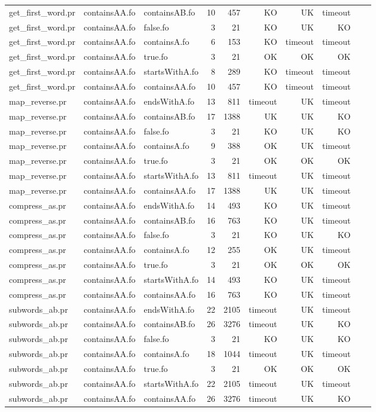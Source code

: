 \begin{tabular}{l|l|l|r|r|r|r|r|r|r}
get\_first\_word.pr & containsAA.fo & containsAB.fo & 10 & 457 & KO & 
UK & timeout \\
get\_first\_word.pr & containsAA.fo & false.fo & 3 & 21 & KO & 
UK & KO \\
get\_first\_word.pr & containsAA.fo & containsA.fo & 6 & 153 & KO & 
timeout & timeout \\
get\_first\_word.pr & containsAA.fo & true.fo & 3 & 21 & OK & 
OK & OK \\
get\_first\_word.pr & containsAA.fo & startsWithA.fo & 8 & 289 & KO & 
timeout & timeout \\
get\_first\_word.pr & containsAA.fo & containsAA.fo & 10 & 457 & KO & 
timeout & timeout \\
map\_reverse.pr & containsAA.fo & endsWithA.fo & 13 & 811 & timeout & 
UK & timeout \\
map\_reverse.pr & containsAA.fo & containsAB.fo & 17 & 1388 & UK & 
UK & KO \\
map\_reverse.pr & containsAA.fo & false.fo & 3 & 21 & KO & 
UK & KO \\
map\_reverse.pr & containsAA.fo & containsA.fo & 9 & 388 & OK & 
UK & timeout \\
map\_reverse.pr & containsAA.fo & true.fo & 3 & 21 & OK & 
OK & OK \\
map\_reverse.pr & containsAA.fo & startsWithA.fo & 13 & 811 & timeout & 
UK & timeout \\
map\_reverse.pr & containsAA.fo & containsAA.fo & 17 & 1388 & UK & 
UK & timeout \\
compress\_as.pr & containsAA.fo & endsWithA.fo & 14 & 493 & KO & 
UK & timeout \\
compress\_as.pr & containsAA.fo & containsAB.fo & 16 & 763 & KO & 
UK & timeout \\
compress\_as.pr & containsAA.fo & false.fo & 3 & 21 & KO & 
UK & KO \\
compress\_as.pr & containsAA.fo & containsA.fo & 12 & 255 & OK & 
UK & timeout \\
compress\_as.pr & containsAA.fo & true.fo & 3 & 21 & OK & 
OK & OK \\
compress\_as.pr & containsAA.fo & startsWithA.fo & 14 & 493 & KO & 
UK & timeout \\
compress\_as.pr & containsAA.fo & containsAA.fo & 16 & 763 & KO & 
UK & timeout \\
subwords\_ab.pr & containsAA.fo & endsWithA.fo & 22 & 2105 & timeout & 
UK & timeout \\
subwords\_ab.pr & containsAA.fo & containsAB.fo & 26 & 3276 & timeout & 
UK & KO \\
subwords\_ab.pr & containsAA.fo & false.fo & 3 & 21 & KO & 
UK & KO \\
subwords\_ab.pr & containsAA.fo & containsA.fo & 18 & 1044 & timeout & 
UK & timeout \\
subwords\_ab.pr & containsAA.fo & true.fo & 3 & 21 & OK & 
OK & OK \\
subwords\_ab.pr & containsAA.fo & startsWithA.fo & 22 & 2105 & timeout & 
UK & timeout \\
subwords\_ab.pr & containsAA.fo & containsAA.fo & 26 & 3276 & timeout & 
UK & KO \\
    \bottomrule
\end{tabular}
